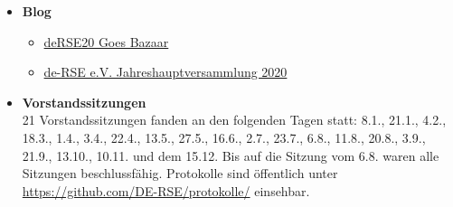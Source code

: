 \begin{itemize}
 \item \textbf{Blog}
 \begin{itemize}
  \item \href{https://de-rse.org/blog/2020/01/31/derse20-goes-bazaar.html}{deRSE20 Goes Bazaar}
  \item \href{https://de-rse.org/blog/2020/09/22/deRSE-MV.html}{de-RSE e.V. Jahreshauptversammlung 2020}
 \end{itemize}
 \item \textbf{Vorstandssitzungen}\\
  21 Vorstandssitzungen fanden an den folgenden Tagen statt: 8.1., 21.1., 4.2., 18.3., 1.4., 3.4., 22.4., 13.5., 27.5., 16.6., 2.7., 23.7., 6.8., 11.8., 20.8., 3.9., 21.9., 13.10., 10.11. und dem 15.12.
  Bis auf die Sitzung vom 6.8. waren alle Sitzungen beschlussfähig.
  Protokolle sind öffentlich unter \href{https://github.com/DE-RSE/protokolle/}{https://github.com/DE-RSE/protokolle/} einsehbar.
\end{itemize}





